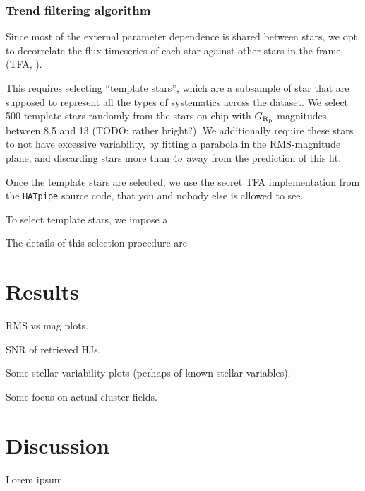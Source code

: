 \documentclass[12pt,twocolumn,tighten]{aastex62}
\begin{document}
\subsubsection{Trend filtering algorithm}
\label{sec:tfa_is_good_enough}


Since most of the external parameter dependence is shared between
stars, we opt to decorrelate the flux timeseries of each star
against other stars in the frame (TFA, \citealt{kovacs_trend_2005}).


This requires selecting ``template stars'', which are a subsample of
star that are supposed to represent all the types of systematics
across the dataset. 
We select 500 template stars randomly from the stars on-chip with
$G_{\rm R_p}$ magnitudes between 8.5 and 13 (TODO: rather bright?).
We additionally require these stars to not have excessive variability,
by fitting a parabola in the RMS-magnitude plane, and discarding stars
more than $4\sigma$ away from the prediction of this fit.

Once the template stars are selected, we use the secret TFA
implementation from the \texttt{HATpipe} source code, that you and
nobody else is allowed to see.

To select template stars, we impose a 

The details of this selection procedure are 


\section{Results}
\label{sec:results}

RMS vs mag plots.

SNR of retrieved HJs.

Some stellar variability plots (perhaps of known stellar variables).

Some focus on actual cluster fields.


\section{Discussion}
\label{sec:discussion}

Lorem ipsum.
\end{document}
